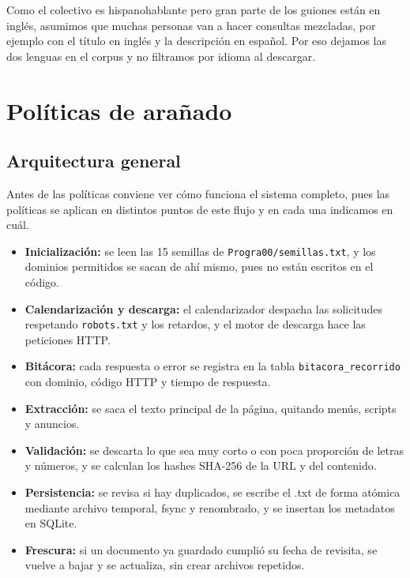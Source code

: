 \documentclass[11pt,spanish]{article}
\begin{document}
Como el colectivo es hispanohablante pero gran parte de los guiones están en inglés, asumimos que muchas personas van a hacer consultas mezcladas, por ejemplo con el título en inglés y la descripción en español. Por eso dejamos las dos lenguas en el corpus y no filtramos por idioma al descargar.

\section{Políticas de arañado}

\subsection{Arquitectura general}

Antes de las políticas conviene ver cómo funciona el sistema completo, pues las políticas se aplican en distintos puntos de este flujo y en cada una indicamos en cuál.

\begin{itemize}[label=\textbullet, leftmargin=*]
    \item \textbf{Inicialización:} se leen las 15 semillas de \texttt{Progra00/semillas.txt}, y los dominios permitidos se sacan de ahí mismo, pues no están escritos en el código.
    \item \textbf{Calendarización y descarga:} el calendarizador despacha las solicitudes respetando \texttt{robots.txt} y los retardos, y el motor de descarga hace las peticiones HTTP.
    \item \textbf{Bitácora:} cada respuesta o error se registra en la tabla \texttt{bitacora\_recorrido} con dominio, código HTTP y tiempo de respuesta.
    \item \textbf{Extracción:} se saca el texto principal de la página, quitando menús, scripts y anuncios.
    \item \textbf{Validación:} se descarta lo que sea muy corto o con poca proporción de letras y números, y se calculan los hashes SHA-256 de la URL y del contenido.
    \item \textbf{Persistencia:} se revisa si hay duplicados, se escribe el .txt de forma atómica mediante archivo temporal, fsync y renombrado, y se insertan los metadatos en SQLite.
    \item \textbf{Frescura:} si un documento ya guardado cumplió su fecha de revisita, se vuelve a bajar y se actualiza, sin crear archivos repetidos.
\end{itemize}
\end{document}
